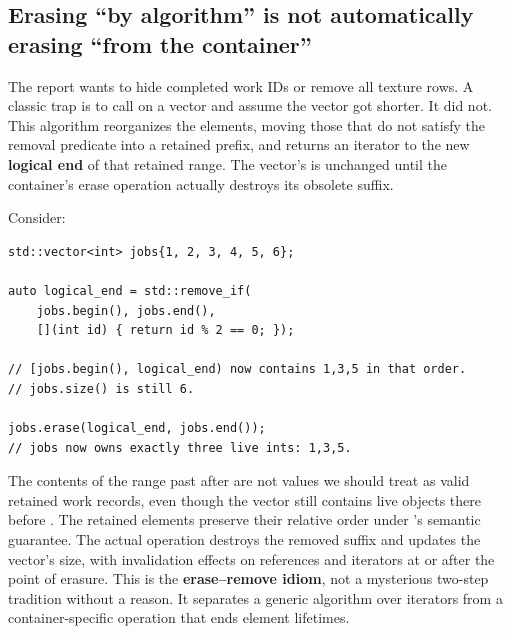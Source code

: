 \subsection{Erasing ``by algorithm'' is not automatically erasing ``from the container''}\label{05-engine-i-ch006-erasing-by-algorithm-is-not-automatically-erasing-from-the-container}

\hypertarget{05-engine-i-ch006-erasing-by-algorithm-is-not-automatically-erasing-from-the-container}{}

The report wants to hide completed work IDs or remove all texture rows. A classic trap is to call  on a vector and assume the vector got shorter. It did not. This algorithm reorganizes the elements, moving those that do not satisfy the removal predicate into a retained prefix, and returns an iterator to the new \textbf{logical end} of that retained range. The vector's  is unchanged until the container's erase operation actually destroys its obsolete suffix.

Consider:

\begin{verbatim}
std::vector<int> jobs{1, 2, 3, 4, 5, 6};

auto logical_end = std::remove_if(
    jobs.begin(), jobs.end(),
    [](int id) { return id % 2 == 0; });

// [jobs.begin(), logical_end) now contains 1,3,5 in that order.
// jobs.size() is still 6.

jobs.erase(logical_end, jobs.end());
// jobs now owns exactly three live ints: 1,3,5.
\end{verbatim}

The contents of the range past  after  are not values we should treat as valid retained work records, even though the vector still contains live objects there before . The retained elements preserve their relative order under 's semantic guarantee. The actual  operation destroys the removed suffix and updates the vector's size, with invalidation effects on references and iterators at or after the point of erasure. This is the \textbf{erase--remove idiom}, not a mysterious two-step tradition without a reason. It separates a generic algorithm over iterators from a container-specific operation that ends element lifetimes.

